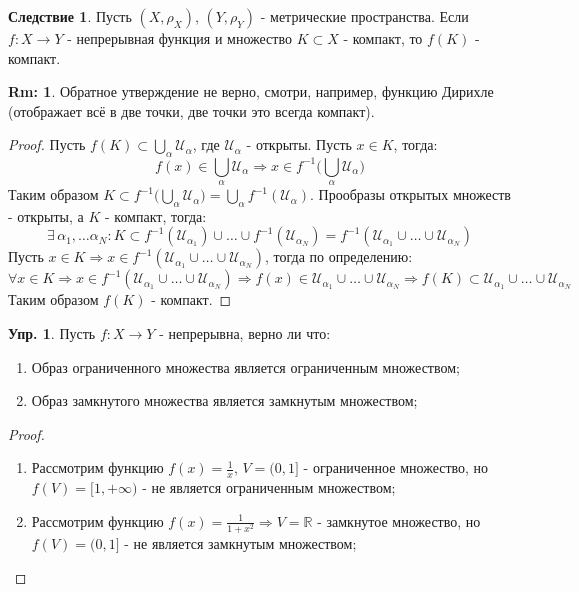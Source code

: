\documentclass[12pt]{article}
\newcommand{\MR}{\mathbb{R}}
\newcommand{\MU}{\mathcal{U}}
\theoremstyle{definition}
\newtheorem{rem}{Rm:}
\newtheorem{exrc}{Упр.}
\newtheorem{corollary}{Следствие}
\begin{document}
\begin{corollary}
	Пусть $(X,\rho_X),\, (Y,\rho_Y)$ - метрические пространства. Если $f \colon X \to Y$ - непрерывная функция и множество $K \subset X$ - компакт, то $f(K)$ - компакт.
\end{corollary}
\begin{rem}
	Обратное утверждение не верно, смотри, например, функцию Дирихле (отображает всё в две точки, две точки это всегда компакт).
\end{rem}
\begin{proof}
	Пусть $f(K) \subset \textstyle \bigcup\limits_{\alpha} \MU_\alpha$, где $\MU_\alpha$ - открыты. Пусть $x \in K$, тогда:
	$$
		 f(x) \in \textstyle \bigcup\limits_{\alpha} \MU_\alpha \Rightarrow x \in f^{-1}\Big(\textstyle \bigcup\limits_{\alpha} \MU_\alpha\Big)
	$$ 
	Таким образом $K \subset \textstyle f^{-1}\Big(\bigcup\limits_{\alpha}\MU_\alpha\Big) = \textstyle \bigcup\limits_{\alpha}f^{-1}(\MU_\alpha)$. Прообразы открытых множеств - открыты, а $K$ - компакт, тогда: 
	$$
		\exists \, \alpha_1,\dotsc \alpha_N \colon K \subset f^{-1}(\MU_{\alpha_1})\cup \dotsc \cup f^{-1}(\MU_{\alpha_N}) = f^{-1}(\MU_{\alpha_1} \cup \dotsc \cup \MU_{\alpha_N})
	$$ 
	Пусть $x \in K \Rightarrow x \in f^{-1}(\MU_{\alpha_1} \cup \dotsc \cup \MU_{\alpha_N})$, тогда по определению: 
	$$
		\forall x \in K \Rightarrow x \in f^{-1}(\MU_{\alpha_1} \cup \dotsc \cup \MU_{\alpha_N}) \Rightarrow f(x) \in \MU_{\alpha_1} \cup \dotsc \cup \MU_{\alpha_N} \Rightarrow f(K) \subset \MU_{\alpha_1} \cup \dotsc \cup \MU_{\alpha_N}
	$$
	Таким образом $f(K)$ - компакт.
\end{proof}
\begin{exrc}
	Пусть $f \colon X \to Y$ - непрерывна, верно ли что:
	\begin{enumerate}[label ={(\arabic*)}]
		\item Образ ограниченного множества является ограниченным множеством;
		\item Образ замкнутого множества является замкнутым множеством;
	\end{enumerate}
\end{exrc}
\begin{proof}\hfill
	\begin{enumerate}[label ={(\arabic*)}]
		\item Рассмотрим функцию $f(x) = \tfrac{1}{x},\, V = (0,1]$ - ограниченное множество, но $f(V) = [1, +\infty)$ - не является ограниченным множеством;	
		\item Рассмотрим функцию $f(x) = \tfrac{1}{1+x^2} \Rightarrow V = \MR$ - замкнутое множество, но $f(V) = (0,1]$ - не является замкнутым множеством;
	\end{enumerate}
\end{proof}
\end{document}
